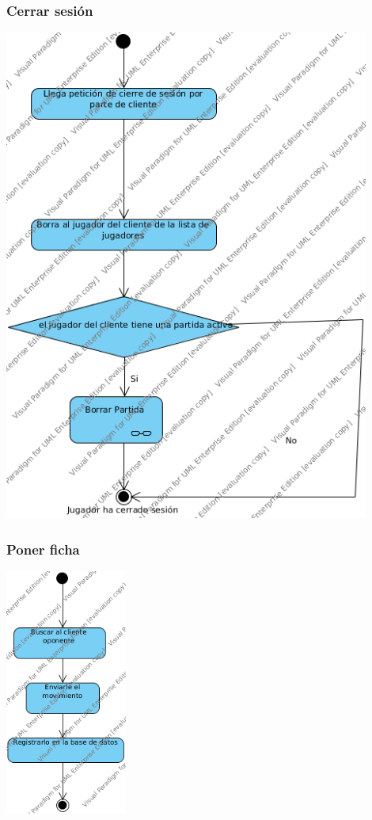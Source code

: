 \documentclass[a4paper,11pt,oneside]{article}
\begin{document}
\subsubsection{Cerrar sesión}

\includegraphics[width=0.9\textwidth]{img/ms_CerrarSesionServidor.png}\\[1cm]

\subsubsection{Poner ficha}

\includegraphics[width=0.3\textwidth]{img/ms_PonerFichaServidor.png}\\[1cm]
\end{document}
